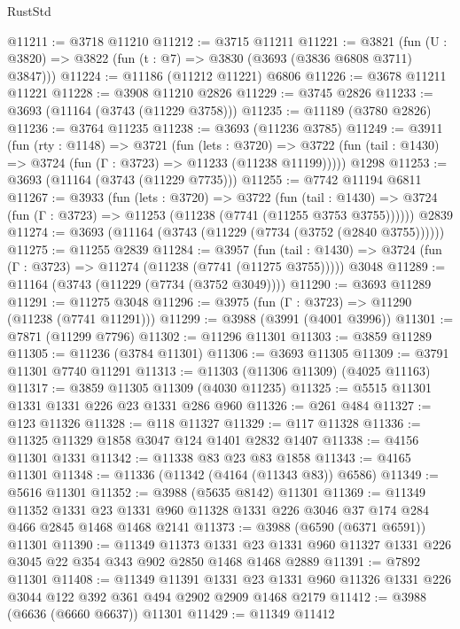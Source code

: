 \begin{lexlean}{RustStd}
\begin{coremodule}
@11211 := @3718 @11210
@11212 := @3715 @11211
@11221 := @3821 (fun (U : @3820) => @3822 (fun (t : @7) => @3830 (@3693 (@3836 @6808 @3711) @3847)))
@11224 := @11186 (@11212 @11221) @6806
@11226 := @3678 @11211 @11221
@11228 := @3908 @11210 @2826
@11229 := @3745 @2826
@11233 := @3693 (@11164 (@3743 (@11229 @3758)))
@11235 := @11189 (@3780 @2826)
@11236 := @3764 @11235
@11238 := @3693 (@11236 @3785)
@11249 := @3911
    (fun (rty : @1148) =>
    @3721
      (fun (lets : @3720) =>
      @3722 (fun (tail : @1430) => @3724 (fun (Γ : @3723) => @11233 (@11238 @11199)))))
    @1298
@11253 := @3693 (@11164 (@3743 (@11229 @7735)))
@11255 := @7742 @11194 @6811
@11267 := @3933
    (fun (lets : @3720) =>
    @3722
      (fun (tail : @1430) =>
      @3724 (fun (Γ : @3723) => @11253 (@11238 (@7741 (@11255 @3753 @3755))))))
    @2839
@11274 := @3693 (@11164 (@3743 (@11229 (@7734 (@3752 (@2840 @3755))))))
@11275 := @11255 @2839
@11284 := @3957
    (fun (tail : @1430) => @3724 (fun (Γ : @3723) => @11274 (@11238 (@7741 (@11275 @3755)))))
    @3048
@11289 := @11164 (@3743 (@11229 (@7734 (@3752 @3049))))
@11290 := @3693 @11289
@11291 := @11275 @3048
@11296 := @3975 (fun (Γ : @3723) => @11290 (@11238 (@7741 @11291)))
@11299 := @3988 (@3991 (@4001 @3996))
@11301 := @7871 (@11299 @7796)
@11302 := @11296 @11301
@11303 := @3859 @11289
@11305 := @11236 (@3784 @11301)
@11306 := @3693 @11305
@11309 := @3791 @11301 @7740 @11291
@11313 := @11303 (@11306 @11309) (@4025 @11163)
@11317 := @3859 @11305 @11309 (@4030 @11235)
@11325 := @5515 @11301 @1331 @1331 @226 @23 @1331 @286 @960
@11326 := @261 @484
@11327 := @123 @11326
@11328 := @118 @11327
@11329 := @117 @11328
@11336 := @11325 @11329 @1858 @3047 @124 @1401 @2832 @1407
@11338 := @4156 @11301 @1331
@11342 := @11338 @83 @23 @83 @1858
@11343 := @4165 @11301
@11348 := @11336 (@11342 (@4164 (@11343 @83)) @6586)
@11349 := @5616 @11301
@11352 := @3988 (@5635 @8142) @11301
@11369 := @11349
    @11352
    @1331
    @23
    @1331
    @960
    @11328
    @1331
    @226
    @3046
    @37
    @174
    @284
    @466
    @2845
    @1468
    @1468
    @2141
@11373 := @3988 (@6590 (@6371 @6591)) @11301
@11390 := @11349
    @11373
    @1331
    @23
    @1331
    @960
    @11327
    @1331
    @226
    @3045
    @22
    @354
    @343
    @902
    @2850
    @1468
    @1468
    @2889
@11391 := @7892 @11301
@11408 := @11349
    @11391
    @1331
    @23
    @1331
    @960
    @11326
    @1331
    @226
    @3044
    @122
    @392
    @361
    @494
    @2902
    @2909
    @1468
    @2179
@11412 := @3988 (@6636 (@6660 @6637)) @11301
@11429 := @11349
    @11412

\end{coremodule}
\end{lexlean}
